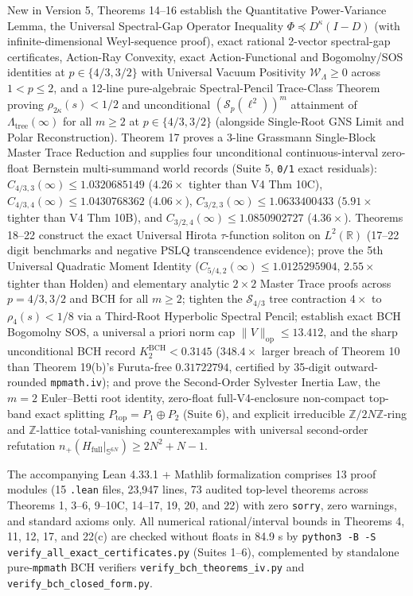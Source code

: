 \documentclass[11pt,a4paper]{article}
\begin{document}
New in Version 5, Theorems 14--16 establish the Quantitative
Power-Variance Lemma, the Universal Spectral-Gap Operator Inequality
\(\Phi \preceq D^\kappa(I-D)\) (with infinite-dimensional
Weyl-sequence proof), exact rational 2-vector spectral-gap certificates,
Action-Ray Convexity, exact Action-Functional and Bogomolny/SOS
identities at \(p \in \{4/3, 3/2\}\) with Universal Vacuum Positivity
\(\mathcal{W}_\Lambda \ge 0\) across \(1 < p \le 2\), and a 12-line
pure-algebraic Spectral-Pencil Trace-Class Theorem proving
\(\rho_{2\kappa}(s) < 1/2\) and unconditional
\((\mathcal{S}_p(\ell^2))^m\) attainment of \(\Lambda_{\mathrm{tree}}(\infty)\)
for all \(m \ge 2\) at \(p \in \{4/3, 3/2\}\) (alongside Single-Root GNS
Limit and Polar Reconstruction). Theorem 17 proves a 3-line Grassmann
Single-Block Master Trace Reduction and supplies four unconditional
continuous-interval zero-float Bernstein multi-summand world records
(Suite 5, \texttt{0/1} exact residuals):
\(C_{4/3,3}(\infty) \le 1.0320685149\) (\(4.26\times\) tighter than V4
Thm 10C), \(C_{4/3,4}(\infty) \le 1.0430768362\) (\(4.06\times\)),
\(C_{3/2,3}(\infty) \le 1.0633400433\) (\(5.91\times\) tighter than V4
Thm 10B), and \(C_{3/2,4}(\infty) \le 1.0850902727\) (\(4.36\times\)).
Theorems 18--22 construct the exact Universal Hirota \(\tau\)-function
soliton on \(L^2(\mathbb{R})\) (17--22 digit benchmarks and negative
PSLQ transcendence evidence); prove the 5th Universal Quadratic Moment
Identity (\(C_{5/4,2}(\infty) \le 1.0125295904\), \(2.55\times\) tighter
than Holden) and elementary analytic \(2\times 2\) Master Trace proofs
across \(p = 4/3, 3/2\) and BCH for all \(m \ge 2\); tighten the
\(\mathcal{S}_{4/3}\) tree contraction \(4\times\) to
\(\rho_4(s) < 1/8\) via a Third-Root Hyperbolic Spectral Pencil;
establish exact BCH Bogomolny SOS, a universal a priori norm cap
\(\|V\|_{\mathrm{op}} \le 13.412\), and the sharp unconditional BCH
record \(K_2^{\mathrm{BCH}} < 0.3145\) (\(348.4\times\) larger breach of
Theorem 10 than Theorem 19(b)'s Furuta-free \(0.31722794\), certified by
35-digit outward-rounded \texttt{mpmath.iv}); and prove the Second-Order
Sylvester Inertia Law, the \(m = 2\) Euler--Betti root identity,
zero-float full-V4-enclosure non-compact top-band exact splitting
\(P_{\mathrm{top}} = P_1 \oplus P_2\) (Suite 6), and explicit
irreducible \(\mathbb{Z}/2N\mathbb{Z}\)-ring and \(\mathbb{Z}\)-lattice
total-vanishing counterexamples with universal second-order refutation
\(n_+(H_{\mathrm{full}}|_{\mathbb{S}^{6N}}) \ge 2N^2 + N - 1\).

The accompanying Lean 4.33.1 + Mathlib formalization comprises 13 proof
modules (15 \texttt{.lean} files, 23,947 lines, 73 audited top-level
theorems across Theorems 1, 3--6, 9--10C, 14--17, 19, 20, and 22) with
zero \texttt{sorry}, zero warnings, and standard axioms only. All
numerical rational/interval bounds in Theorems 4, 11, 12, 17, and 22(c)
are checked without floats in 84.9 s by
\texttt{python3 -B -S verify\_all\_exact\_certificates.py} (Suites 1--6),
complemented by standalone pure-\texttt{mpmath} BCH verifiers
\texttt{verify\_bch\_theorems\_iv.py} and
\texttt{verify\_bch\_closed\_form.py}.
\end{document}
